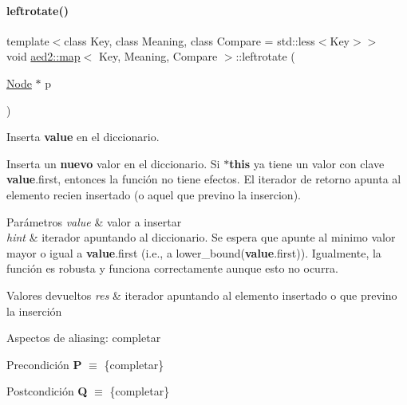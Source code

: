 \paragraph{\texorpdfstring{leftrotate()}{leftrotate()}}
{\footnotesize\ttfamily template$<$class Key, class Meaning, class Compare = std\+::less$<$\+Key$>$$>$ \\
void \hyperlink{classaed2_1_1map}{aed2\+::map}$<$ Key, Meaning, Compare $>$\+::leftrotate (\begin{DoxyParamCaption}\item[{\hyperlink{structaed2_1_1map_1_1Node}{Node} $\ast$}]{p }\end{DoxyParamCaption})\hspace{0.3cm}{\ttfamily [inline]}}



Inserta {\bfseries value} en el diccionario. 

Inserta un {\bfseries nuevo} valor en el diccionario. Si {\bfseries $\ast$this} ya tiene un valor con clave {\bfseries value}.first, entonces la función no tiene efectos. El iterador de retorno apunta al elemento recien insertado (o aquel que previno la insercion).


\begin{DoxyParams}{Parámetros}
{\em value} & valor a insertar \\
\hline
{\em hint} & iterador apuntando al diccionario. Se espera que apunte al minimo valor mayor o igual a {\bfseries value}.first (i.\+e., a lower\+\_\+bound({\bfseries value}.first)). Igualmente, la función es robusta y funciona correctamente aunque esto no ocurra. \\
\hline
\end{DoxyParams}

\begin{DoxyRetVals}{Valores devueltos}
{\em res} & iterador apuntando al elemento insertado o que previno la inserción\\
\hline
\end{DoxyRetVals}
\begin{DoxyParagraph}{Aspectos de aliasing\+:}
completar
\end{DoxyParagraph}
\begin{DoxyPrecond}{Precondición}
{\bfseries P} $\equiv$ \{completar\} 
\end{DoxyPrecond}
\begin{DoxyPostcond}{Postcondición}
{\bfseries Q} $\equiv$ \{completar\}
\end{DoxyPostcond}

